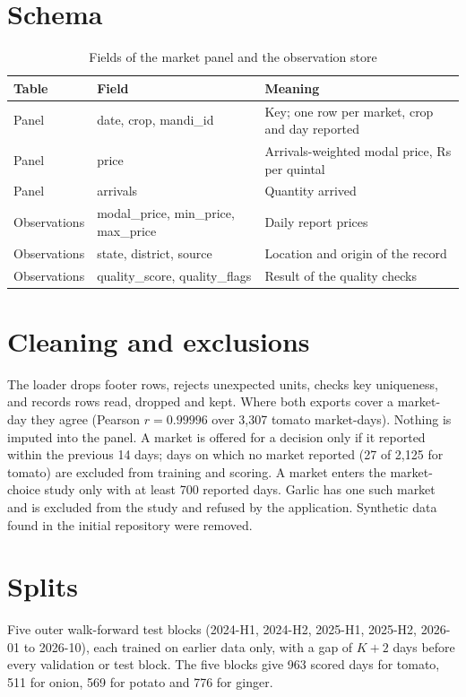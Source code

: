 \section{Schema}
\begin{table}[!t]
\centering
\caption{Fields of the market panel and the observation store}
\label{tab:d-schema}
\small
\begin{tabular}{|l|l|p{7.2cm}|}
\hline
\textbf{Table} & \textbf{Field} & \textbf{Meaning} \\ \hline
Panel & date, crop, mandi\_id & Key; one row per market, crop and day reported \\ \hline
Panel & price & Arrivals-weighted modal price, Rs per quintal \\ \hline
Panel & arrivals & Quantity arrived \\ \hline
Observations & modal\_price, min\_price, max\_price & Daily report prices \\ \hline
Observations & state, district, source & Location and origin of the record \\ \hline
Observations & quality\_score, quality\_flags & Result of the quality checks \\ \hline
\end{tabular}
\end{table}

\section{Cleaning and exclusions}
The loader drops footer rows, rejects unexpected units, checks key uniqueness, and records rows read, dropped and kept. Where both exports cover a market-day they agree (Pearson $r=0.99996$ over 3,307 tomato market-days). Nothing is imputed into the panel. A market is offered for a decision only if it reported within the previous 14 days; days on which no market reported (27 of 2,125 for tomato) are excluded from training and scoring. A market enters the market-choice study only with at least 700 reported days. Garlic has one such market and is excluded from the study and refused by the application. Synthetic data found in the initial repository were removed.

\section{Splits}
Five outer walk-forward test blocks (2024-H1, 2024-H2, 2025-H1, 2025-H2, 2026-01 to 2026-10), each trained on earlier data only, with a gap of $K{+}2$ days before every validation or test block. The five blocks give 963 scored days for tomato, 511 for onion, 569 for potato and 776 for ginger.

